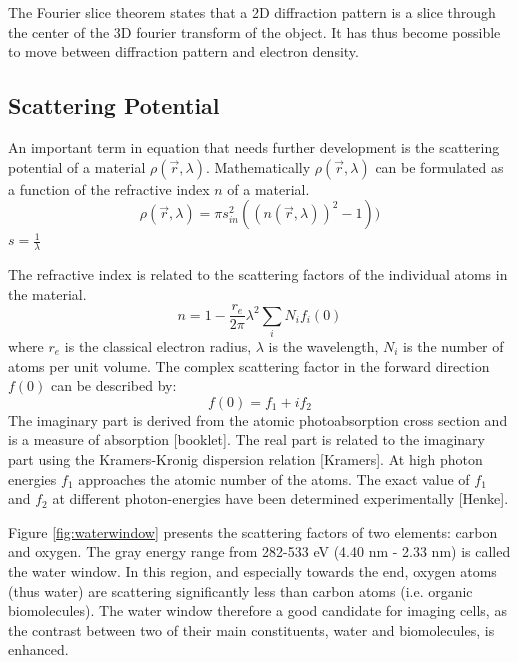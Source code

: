 The Fourier slice theorem states that a 2D diffraction pattern is a slice through the center of the 3D fourier transform of the object.
It has thus become possible to move between diffraction pattern and electron density.


\subsection{Scattering Potential}
An important term in equation that needs further development is the scattering potential of a material $\rho(\vec{r},\lambda)$. Mathematically $\rho(\vec{r},\lambda)$ can be formulated as a function of the refractive index $n$ of a material.
\begin{equation}
\rho(\vec{r},\lambda) = \pi s_{in}^2 (( n(\vec{r},\lambda))^2 -1))
\end{equation}
$s = \frac{1}{\lambda}$

The refractive index is related to the scattering factors of the individual atoms in the material.
\begin{equation}
n = 1-\frac{r_e}{2\pi} \lambda^{2} \sum_{i} N_i f_i(0)
\end{equation}
where $r_e$ is the classical electron radius, $\lambda$ is the wavelength, $N_i$ is the number of atoms per unit volume. The complex scattering factor in the forward direction $f(0)$ can be described by: 
\begin{equation}
f(0) = f_1 + i f_2
\end{equation}
The imaginary part is derived from the atomic photoabsorption cross section and is a measure of absorption [booklet]. The real part is related to the imaginary part using the Kramers-Kronig dispersion relation [Kramers]. At high photon energies $f_1$ approaches the atomic number of the atoms. The exact value of $f_1$ and $f_2$ at different photon-energies have been determined experimentally [Henke]. 

Figure \ref{fig:waterwindow} presents the scattering factors of two elements: carbon and oxygen. The gray energy range from 282-533 eV (4.40 nm - 2.33 nm) is called the water window. In this region, and especially towards the end, oxygen atoms (thus water) are scattering significantly less than carbon atoms (i.e. organic biomolecules). The water window therefore a good candidate for imaging cells, as the contrast between two of their main constituents, water and biomolecules, is enhanced.

